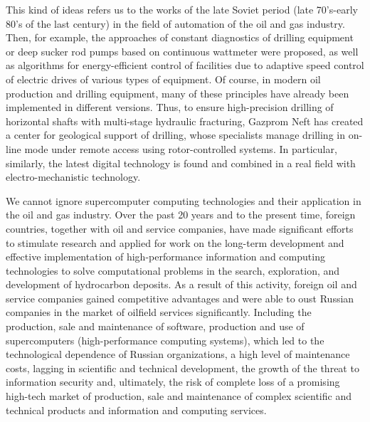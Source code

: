 \documentclass[12pt]{report}
\theoremstyle{definition}
\begin{document}
This kind of ideas refers us to the works of the late Soviet period (late 70's-early 80's of the last century) in the field of automation of the oil and gas industry.
Then, for example, the approaches of constant diagnostics of drilling equipment or deep sucker rod pumps based on continuous wattmeter were proposed, as well as algorithms for energy-efficient control of facilities due to adaptive speed control of electric drives of various types of equipment.
Of course, in modern oil production and drilling equipment, many of these principles have already been implemented in different versions.
Thus, to ensure high-precision drilling of horizontal shafts with multi-stage hydraulic fracturing, Gazprom Neft has created a center for geological support of drilling, whose specialists manage drilling in on-line mode under remote access using rotor-controlled systems.
In particular, similarly, the latest digital technology is found and combined in a real field with electro-mechanistic technology.

We cannot ignore supercomputer computing technologies and their application in the oil and gas industry.
Over the past 20 years and to the present time, foreign countries, together with oil and service companies, have made significant efforts to stimulate research and applied for work on the long-term development and effective implementation of high-performance information and computing technologies to solve computational problems in the search, exploration, and development of hydrocarbon deposits.
As a result of this activity, foreign oil and service companies gained competitive advantages and were able to oust Russian companies in the market of oilfield services significantly. Including the production, sale and maintenance of software, production and use of supercomputers (high-performance computing systems), which led to the technological dependence of Russian organizations, a high level of maintenance costs, lagging in scientific and technical development, the growth of the threat to information security and, ultimately, the risk of complete loss of a promising high-tech market of production, sale and maintenance of complex scientific and technical products and information and computing services.
\end{document}
